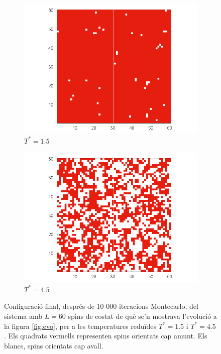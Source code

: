 \documentclass[a4paper]{article}
\begin{document}
\begin{figure}[H]
    \centering
    \begin{subfigure}{.45\textwidth}
        \centering
        \includegraphics[width=\textwidth]{SIM-L-060-TEMP-1500.png}
        \caption{$T^*=1.5$}
        \label{fig:conf_low}
    \end{subfigure}
    \begin{subfigure}{.45\textwidth}
        \centering
        \includegraphics[width=\textwidth]{SIM-L-060-TEMP-4500.png}
        \caption{$T^*=4.5$}
        \label{fig:conf_high}
    \end{subfigure}
    \caption{Configuració final, després de 10 000 iteracions Montecarlo, del sistema amb $L=60$ spins de costat de què se'n mostrava l'evolució a la figura \ref{fig:evo}, per a les temperatures reduïdes $T^*=1.5$ i $T^*=4.5$. Els quadrats vermells representen spins orientats cap amunt. Els blancs, spins orientats cap avall.}
\label{fig:conf}
\end{figure}
\end{document}
